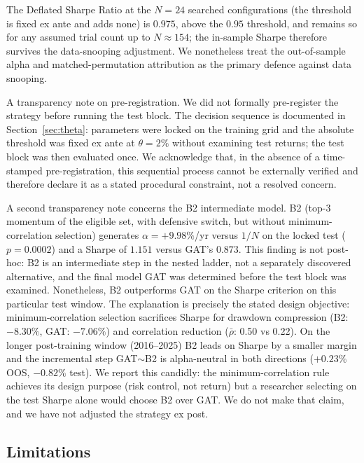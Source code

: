 The \citet{bailey2014} Deflated Sharpe Ratio at the $N=24$ searched configurations
(the threshold is fixed ex ante and adds none) is $0.975$, above the $0.95$
threshold, and remains so for any assumed trial count up to $N \approx 154$; the
in-sample Sharpe therefore survives the data-snooping adjustment. We nonetheless
treat the out-of-sample alpha and matched-permutation attribution as the primary
defence against data snooping.

A transparency note on pre-registration. We did not formally pre-register the
strategy before running the test block. The decision sequence is documented in
Section~\ref{sec:theta}: parameters were locked on the training grid and the absolute
threshold was fixed ex ante at $\theta = 2\%$ without examining test returns; the
test block was then evaluated once. We acknowledge that, in the absence of a
time-stamped pre-registration, this sequential process cannot be externally verified
and therefore declare it as a stated procedural constraint, not a resolved concern.

A second transparency note concerns the B2 intermediate model. B2 (top-3 momentum
of the eligible set, with defensive switch, but without minimum-correlation
selection) generates $\alpha = +9.98\%$/yr versus $1/N$ on the locked test
($p = 0.0002$) and a Sharpe of $1.151$ versus GAT's $0.873$. This finding is not
post-hoc: B2 is an intermediate step in the nested ladder, not a separately
discovered alternative, and the final model GAT was determined before the test block
was examined. Nonetheless, B2 outperforms GAT on the Sharpe criterion on this
particular test window. The explanation is precisely the stated design objective:
minimum-correlation selection sacrifices Sharpe for drawdown compression
(B2: $-8.30\%$, GAT: $-7.06\%$) and correlation reduction ($\bar\rho$: 0.50 vs 0.22).
On the longer post-training window (2016--2025) B2 leads on Sharpe by a smaller margin
and the incremental step GAT$\sim$B2 is alpha-neutral in both directions
($+0.23\%$ OOS, $-0.82\%$ test). We report this candidly: the minimum-correlation rule
achieves its design purpose (risk control, not return) but a researcher selecting on
the test Sharpe alone would choose B2 over GAT. We do not make that claim, and we
have not adjusted the strategy ex post.

\subsection{Limitations}

